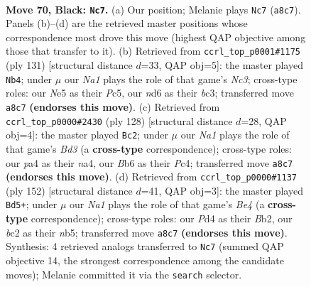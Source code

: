 \documentclass[11pt]{article}
\begin{document}
\clearpage

\begin{figure}[p]\centering
\begin{subfigure}{0.46\textwidth}\centering
\resizebox{\linewidth}{!}{%
\newchessgame
\chessboard[
  setfen={n7/6k1/1b1N4/p3n3/P2pP3/1P5p/1KB1P3/8 b - - 7 70},
  showmover=false,
  pgfstyle=straightmove, color=movearrow, markmove={a8-c7}
]}
\caption{}
\end{subfigure}\hfill
\begin{subfigure}{0.46\textwidth}\centering
\resizebox{\linewidth}{!}{%
\newchessgame
\chessboard[
  setfen={8/4b3/2n1k1p1/2p4p/5P2/2BPPK1N/8/8 b - - 4 66},
  showmover=false,
  pgfstyle=straightmove, color=movearrow, markmove={c6-b4}
]}
\caption{}
\end{subfigure}
\\[4pt]
\begin{subfigure}{0.46\textwidth}\centering
\resizebox{\linewidth}{!}{%
\newchessgame
\chessboard[
  setfen={2b5/8/3kp3/NPp3p1/n1P3P1/3BK3/8/8 w - - 0 65},
  showmover=false,
  pgfstyle=straightmove, color=movearrow, markmove={d3-c2}
]}
\caption{}
\end{subfigure}\hfill
\begin{subfigure}{0.46\textwidth}\centering
\resizebox{\linewidth}{!}{%
\newchessgame
\chessboard[
  setfen={5bk1/1r6/1pNp4/1n5p/4B2P/6P1/1B4K1/8 w - - 1 77},
  showmover=false,
  pgfstyle=straightmove, color=movearrow, markmove={e4-d5}
]}
\caption{}
\end{subfigure}
\caption{\textbf{Move 70, Black: \texttt{Nc7}.} (a) Our position; Melanie plays \texttt{Nc7} (\texttt{a8c7}). Panels (b)--(d) are the retrieved master positions whose correspondence most drove this move (highest QAP objective among those that transfer to it). (b) Retrieved from \texttt{ccrl\_top\_p0001\#1175} (ply 131) [structural distance $d$=33, QAP obj=5]: the master played \texttt{Nb4}; under $\mu$ our \emph{Na1} plays the role of that game's \emph{Nc3}; cross-type roles: our \emph{N}e5 as their \emph{P}c5, our \emph{n}d6 as their \emph{b}c3; transferred move \texttt{a8c7} \textbf{(endorses this move)}. (c) Retrieved from \texttt{ccrl\_top\_p0000\#2430} (ply 128) [structural distance $d$=28, QAP obj=4]: the master played \texttt{Bc2}; under $\mu$ our \emph{Na1} plays the role of that game's \emph{Bd3} (a \textbf{cross-type} correspondence); cross-type roles: our \emph{p}a4 as their \emph{n}a4, our \emph{B}b6 as their \emph{P}c4; transferred move \texttt{a8c7} \textbf{(endorses this move)}. (d) Retrieved from \texttt{ccrl\_top\_p0000\#1137} (ply 152) [structural distance $d$=41, QAP obj=3]: the master played \texttt{Bd5+}; under $\mu$ our \emph{Na1} plays the role of that game's \emph{Be4} (a \textbf{cross-type} correspondence); cross-type roles: our \emph{P}d4 as their \emph{B}b2, our \emph{b}c2 as their \emph{n}b5; transferred move \texttt{a8c7} \textbf{(endorses this move)}. Synthesis: 4 retrieved analogs transferred to \texttt{Nc7} (summed QAP objective 14, the strongest correspondence among the candidate moves); Melanie committed it via the \texttt{search} selector.}
\label{fig:thought-m139}
\end{figure}
\end{document}
